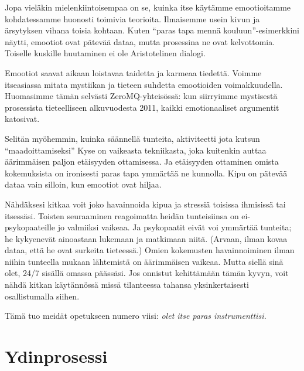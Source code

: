 Jopa vieläkin mielenkiintoisempaa on se, kuinka itse käytämme emootioitamme kohdatessamme huonosti toimivia teorioita. Ilmaisemme usein kivun ja ärsytyksen vihana toisia kohtaan. Kuten ``paras tapa mennä kouluun''-esimerkkini näytti, emootiot ovat pätevää dataa, mutta prosessina ne ovat kelvottomia. Toiselle kuskille huutaminen ei ole Aristotelinen dialogi.

Emootiot saavat aikaan loistavaa taidetta ja karmeaa tiedettä. Voimme itseasiassa mitata mystiikan ja tieteen suhdetta emootioiden voimakkuudella. Huomasimme tämän selvästi ZeroMQ-yhteisössä: kun siirryimme mystisestä prosessista tieteelliseen alkuvuodesta 2011, kaikki emotionaaliset argumentit katosivat.

Selitän myöhemmin, kuinka säännellä tunteita, aktiviteetti jota kutsun ``maadoittamiseksi'' Kyse on vaikeasta tekniikasta, joka kuitenkin auttaa äärimmäisen paljon etäisyyden ottamisessa. Ja etäisyyden ottaminen omista kokemuksista on ironisesti paras tapa ymmärtää ne kunnolla. Kipu on pätevää dataa vain silloin, kun emootiot ovat hiljaa.

Nähdäksesi kitkaa voit joko havainnoida kipua ja stressiä toisissa ihmisissä tai itsessäsi. Toisten seuraaminen reagoimatta heidän tunteisiinsa on ei-psykopaateille jo valmiiksi vaikeaa. Ja psykopaatit eivät voi ymmärtää tunteita; he kykyenevät ainoastaan lukemaan ja matkimaan niitä. (Arvaan, ilman kovaa dataa, että he ovat surkeita tieteessä.) Omien kokemusten havainnoiminen ilman niihin tunteella mukaan lähtemistä on äärimmäisen vaikeaa. Mutta siellä sinä olet, 24/7 sisällä omassa päässäsi. Jos onnistut kehittämään tämän kyvyn, voit nähdä kitkan käytännössä missä tilanteessa tahansa yksinkertaisesti osallistumalla siihen.

Tämä tuo meidät opetukseen numero viisi: \emph{olet itse paras instrumenttisi.}

\section{Ydinprosessi}

